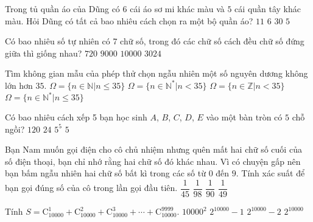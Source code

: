 \begin{ex}%
	Trong tủ quần áo của Dũng có $6$ cái áo sơ mi khác màu và $5$ cái quần tây khác màu. Hỏi Dũng có tất cả bao nhiêu cách chọn ra một bộ quần áo?
	\choice
	{$11$}
	{$6$}
	{\True $30$}
	{$5$}
\end{ex}

\begin{ex}%
	Có bao nhiêu số tự nhiên có 7 chữ số, trong đó các chữ số cách đều chữ số đứng giữa thì giống nhau?
	\choice
	{$720$}
	{\True $9000$}
	{$10000$}
	{$3024$}
\end{ex}

\begin{ex}%
	Tìm không gian mẫu của phép thử chọn ngẫu nhiên một số nguyên dương không lớn hơn $35$.
	\choice
	{$\Omega=\{n\in \mathbb{N} \big| n\le 35\}$}
	{$\Omega=\{n\in \mathbb{N}^* \big| n<35\}$}
	{$\Omega=\{n\in \mathbb{Z} \big| n<35\}$}
	{\True $\Omega=\{n\in \mathbb{N}^* \big| n\le 35\}$}
\end{ex}

\begin{ex}%
	Có bao nhiêu cách xếp 5 bạn học sinh $A$, $B$, $C$, $D$, $E$ vào một bàn tròn có $5$ chỗ ngồi?
	\choice
	{$120$}
	{\True$24$}
	{$5^5$}
	{$5$}
\end{ex}

\begin{ex}%
	Bạn Nam muốn gọi điện cho cô chủ nhiệm nhưng quên mất hai chữ số cuối của số điện thoại, bạn chỉ nhớ rằng hai chữ số đó khác nhau. Vì có chuyện gấp nên bạn bấm ngẫu nhiên hai chữ số bất kì trong các số từ $0$ đến $9$. Tính xác suất để bạn gọi đúng số của cô trong lần gọi đầu tiên.
	\choice
	{$\dfrac{1}{45}$}
	{$\dfrac{1}{98}$}
	{\True $\dfrac{1}{90}$}
	{$\dfrac{1}{49}$}
\end{ex}

\begin{ex}%
	Tính $S=\mathrm{C}_{10000}^{1}+\mathrm{C}_{10000}^{2}+\mathrm{C}_{10000}^{3}+\cdots+\mathrm{C}_{10000}^{9999}$.
	\choice
	{$10000^2$}
	{$2^{10000}-1$}
	{\True$2^{10000}-2$}
	{$2^{10000}$}
\end{ex}

